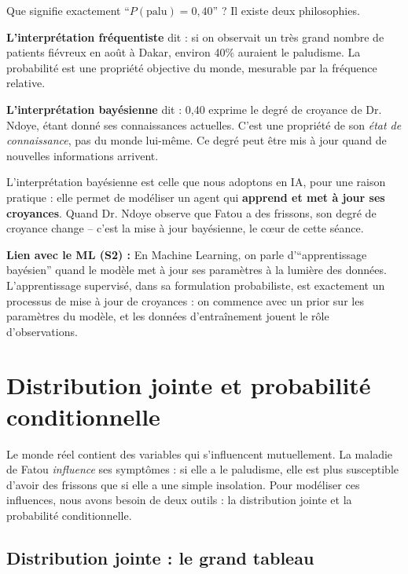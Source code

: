 \documentclass[11pt,a4paper]{article}
\begin{document}
Que signifie exactement ``$P(\text{palu}) = 0{,}40$'' ? Il existe deux philosophies.

\textbf{L'interprétation fréquentiste} dit : si on observait un très grand nombre de patients fiévreux en août à Dakar, environ 40\% auraient le paludisme. La probabilité est une propriété objective du monde, mesurable par la fréquence relative.

\textbf{L'interprétation bayésienne} dit : 0,40 exprime le degré de croyance de Dr. Ndoye, étant donné ses connaissances actuelles. C'est une propriété de son \textit{état de connaissance}, pas du monde lui-même. Ce degré peut être mis à jour quand de nouvelles informations arrivent.

\begin{attentionbox}
L'interprétation bayésienne est celle que nous adoptons en IA, pour une raison pratique : elle permet de modéliser un agent qui \textbf{apprend et met à jour ses croyances}. Quand Dr. Ndoye observe que Fatou a des frissons, son degré de croyance change -- c'est la mise à jour bayésienne, le cœur de cette séance.

\textbf{Lien avec le ML (S2) :} En Machine Learning, on parle d'``apprentissage bayésien'' quand le modèle met à jour ses paramètres à la lumière des données. L'apprentissage supervisé, dans sa formulation probabiliste, est exactement un processus de mise à jour de croyances : on commence avec un prior sur les paramètres du modèle, et les données d'entraînement jouent le rôle d'observations.
\end{attentionbox}

\section{Distribution jointe et probabilité conditionnelle}

Le monde réel contient des variables qui s'influencent mutuellement. La maladie de Fatou \textit{influence} ses symptômes : si elle a le paludisme, elle est plus susceptible d'avoir des frissons que si elle a une simple insolation. Pour modéliser ces influences, nous avons besoin de deux outils : la distribution jointe et la probabilité conditionnelle.

\subsection{Distribution jointe : le grand tableau}
\end{document}
